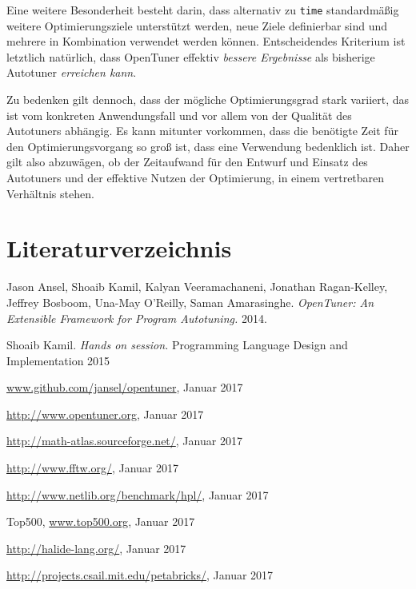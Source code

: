 \documentclass[a4paper,11pt]{scrartcl}
\begin{document}
Eine weitere Besonderheit besteht darin, dass alternativ zu \texttt{time} 
standardmäßig weitere Optimierungsziele unterstützt werden, neue
Ziele definierbar sind und mehrere in Kombination verwendet werden können.
Entscheidendes Kriterium ist letztlich natürlich, dass OpenTuner 
effektiv \emph{bessere Ergebnisse} als bisherige Autotuner \emph{erreichen kann}. \newline

Zu bedenken gilt dennoch, dass der mögliche Optimierungsgrad stark variiert, das ist 
vom konkreten Anwendungsfall und vor allem von der Qualität des Autotuners abhängig.
Es kann mitunter vorkommen, dass die benötigte Zeit für den Optimierungsvorgang
so groß ist, dass eine Verwendung bedenklich ist.
Daher gilt also abzuwägen, ob der Zeitaufwand für den Entwurf und Einsatz des Autotuners
und der effektive Nutzen der Optimierung, in einem vertretbaren Verhältnis stehen.
\newpage



\section{Literaturverzeichnis}

\begin{thebibliography}{9}

  
 Jason Ansel, Shoaib Kamil, Kalyan Veeramachaneni, Jonathan Ragan-Kelley, Jeffrey Bosboom, Una-May O'Reilly, Saman Amarasinghe. \emph{OpenTuner: An Extensible Framework for Program Autotuning.} 2014.

\bibitem{} Shoaib Kamil. \emph{Hands on session.} Programming Language Design and
Implementation 2015

 \url{www.github.com/jansel/opentuner}, Januar 2017

 \url{http://www.opentuner.org}, Januar 2017
   
 \url{http://math-atlas.sourceforge.net/}, Januar 2017

 \url{http://www.fftw.org/}, Januar 2017
    

 \url{http://www.netlib.org/benchmark/hpl/}, Januar 2017

  Top500, \url{www.top500.org}, Januar 2017

 \url{http://halide-lang.org/}, Januar 2017

  \url{http://projects.csail.mit.edu/petabricks/}, Januar 2017

\end{thebibliography}
\end{document}
